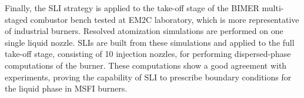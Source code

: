 Finally, the SLI strategy is applied to the take-off stage of the BIMER multi-staged combustor bench tested at EM2C laboratory, which is more representative of industrial burners. Resolved atomization simulations are performed on one single liquid nozzle. SLIs are built from these simulations and applied to the full take-off stage, consisting of 10 injection nozzles, for performing dispersed-phase computations of the burner. These computations show a good agreement with experiments, proving the capability of SLI to prescribe boundary conditions for the liquid phase in MSFI burners.






        
